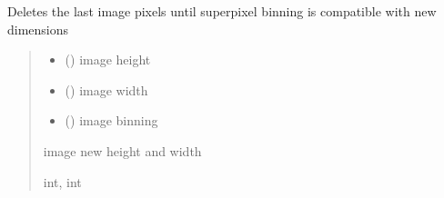 \documentclass[letterpaper,10pt,english]{sphinxmanual}
\begin{document}
\begin{fulllineitems}
\label{\detokenize{micropolarray.processing:micropolarray.processing.rebin.trim_to_match_2xbinning}}
\pysigstartsignatures
{}
\pysigstopsignatures
\sphinxAtStartPar
Deletes the last image pixels until superpixel binning is compatible with new dimensions
\begin{quote}\begin{description}
\begin{itemize}
\item {} 
\sphinxAtStartPar
{} () \textendash{} image height

\item {} 
\sphinxAtStartPar
{} () \textendash{} image width

\item {} 
\sphinxAtStartPar
{} () \textendash{} image binning

\end{itemize}

\sphinxAtStartPar
image new height and width

\sphinxAtStartPar
int, int

\end{description}\end{quote}

\end{fulllineitems}

\end{document}
